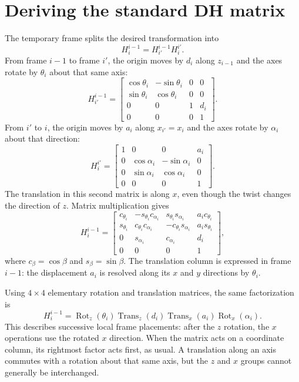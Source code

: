 \section{Deriving the standard DH matrix}
\label{sec:l10-dh-matrix}
The temporary frame splits the desired transformation into
\begin{equation}
 H_i^{i-1}=H_{i'}^{i-1}H_i^{i'}.
 \label{eq:l10-dh-factor}
\end{equation}
From frame $i-1$ to frame $i'$, the origin moves by $d_i$ along
$z_{i-1}$ and the axes rotate by $\theta_i$ about that same axis:
\begin{equation}
 H_{i'}^{i-1}=\begin{bmatrix}
 \cos\theta_i&-\sin\theta_i&0&0\\
 \sin\theta_i& \cos\theta_i&0&0\\
 0&0&1&d_i\\0&0&0&1
 \end{bmatrix}.
 \label{eq:l10-dh-z}
\end{equation}
From $i'$ to $i$, the origin moves by $a_i$ along $x_{i'}=x_i$ and
the axes rotate by $\alpha_i$ about that direction:
\begin{equation}
 H_i^{i'}=\begin{bmatrix}
 1&0&0&a_i\\
 0&\cos\alpha_i&-\sin\alpha_i&0\\
 0&\sin\alpha_i& \cos\alpha_i&0\\
 0&0&0&1
 \end{bmatrix}.
 \label{eq:l10-dh-x}
\end{equation}
The translation in this second matrix is along $x$, even though the
twist changes the direction of $z$. Matrix multiplication gives
\begin{equation}
 \boxed{H_i^{i-1}=\begin{bmatrix}
 c_{\theta_i}&-s_{\theta_i}c_{\alpha_i}&s_{\theta_i}s_{\alpha_i}&a_ic_{\theta_i}\\
 s_{\theta_i}&c_{\theta_i}c_{\alpha_i}&-c_{\theta_i}s_{\alpha_i}&a_is_{\theta_i}\\
 0&s_{\alpha_i}&c_{\alpha_i}&d_i\\
 0&0&0&1
 \end{bmatrix},}
 \label{eq:l10-dh-full}
\end{equation}
where $c_\beta=\cos\beta$ and $s_\beta=\sin\beta$.
The translation column is expressed in frame $i-1$: the displacement
$a_i$ is resolved along its $x$ and $y$ directions by $\theta_i$.

Using $4\times4$ elementary rotation and translation matrices, the same
factorization is
\[
 H_i^{i-1}=\operatorname{Rot}_z(\theta_i)
 \operatorname{Trans}_z(d_i)
 \operatorname{Trans}_x(a_i)\operatorname{Rot}_x(\alpha_i).
\]
This describes successive local frame placements: after the $z$ rotation,
the $x$ operations use the rotated $x$ direction. When the matrix acts on
a coordinate column, its rightmost factor acts first, as usual.
A translation along an axis commutes with a rotation about that same
axis, but the $z$ and $x$ groups cannot generally be interchanged.

